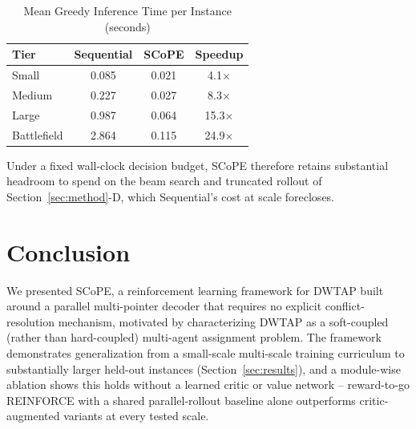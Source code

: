 \documentclass[smallcondensed]{svjour3}
\begin{document}
\begin{table}[htbp]
\centering
\small
\caption{Mean Greedy Inference Time per Instance (seconds)}
\label{tab:efficiency}
\begin{tabular}{l|ccc}
\hline
\textbf{Tier} & \textbf{Sequential} & \textbf{SCoPE} & \textbf{Speedup} \\ \hline
Small & 0.085 & 0.021 & 4.1$\times$ \\
Medium & 0.227 & 0.027 & 8.3$\times$ \\
Large & 0.987 & 0.064 & 15.3$\times$ \\
Battlefield & 2.864 & 0.115 & 24.9$\times$ \\ \hline
\end{tabular}
\end{table}

Under a fixed wall-clock decision budget, SCoPE therefore retains substantial headroom to spend on the beam search and truncated rollout of Section~\ref{sec:method}-D, which Sequential's cost at scale forecloses. %

\section{Conclusion}
\label{sec:conclusion}


We presented SCoPE, a reinforcement learning framework for DWTAP built around a parallel multi-pointer decoder that requires no explicit conflict-resolution mechanism, motivated by characterizing DWTAP as a soft-coupled (rather than hard-coupled) multi-agent assignment problem. The framework demonstrates generalization from a small-scale multi-scale training curriculum to substantially larger held-out instances (Section~\ref{sec:results}), and a module-wise ablation shows this holds without a learned critic or value network -- reward-to-go REINFORCE with a shared parallel-rollout baseline alone outperforms critic-augmented variants at every tested scale.
\end{document}
